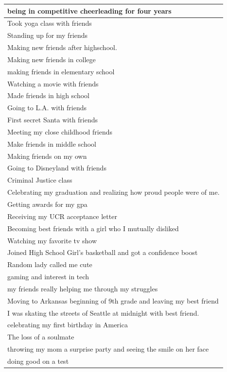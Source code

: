 \documentclass[
  .7em,
  letterpaper,
  DIV=11,
  numbers=noendperiod]{scrartcl}
\begin{document}
\begin{table}
\begin{tabular}{l}
\hline
being in competitive cheerleading for four years\\
\hline
Took yoga class with friends\\
\hline
Standing up for my friends\\
\hline
Making new friends after highschool.\\
\hline
Making new friends in college\\
\hline
making friends in elementary school\\
\hline
Watching a movie with friends\\
\hline
Made friends in high school\\
\hline
Going to L.A. with friends\\
\hline
First secret Santa with friends\\
\hline
Meeting my close childhood friends\\
\hline
Make friends in middle school\\
\hline
Making friends on my own\\
\hline
Going to Disneyland with friends\\
\hline
Criminal Justice class\\
\hline
Celebrating my graduation and realizing how proud people were of me.\\
\hline
Getting awards for my gpa\\
\hline
Receiving my UCR acceptance letter\\
\hline
Becoming best friends with a girl who I mutually disliked\\
\hline
Watching my favorite tv show\\
\hline
Joined High School Girl's basketball and got a confidence boost\\
\hline
Random lady called me cute\\
\hline
gaming and interest in tech\\
\hline
my friends really helping me through my struggles\\
\hline
Moving to Arkansas beginning of 9th grade and leaving my best friend\\
\hline
I was skating the streets of Seattle at midnight with best friend.\\
\hline
celebrating my first birthday in America\\
\hline
The loss of a soulmate\\
\hline
throwing my mom a surprise party and seeing the smile on her face\\
\hline
doing good on a test\\

\end{tabular}
\end{table}
\end{document}
